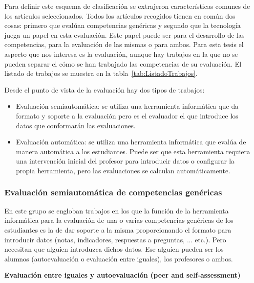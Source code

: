 
Para definir  este esquema de clasificación se extrajeron características comunes de los articulos seleccionados. Todos los artículos recogidos tienen en común dos cosas: primero que evalúan competencias genéricas y segundo que la tecnología juega un papel en esta evaluación. Este papel puede ser para el desarrollo de las competencias, para la evaluación de las mismas o para ambos. Para esta tesis el aspecto que nos interesa es la evaluación, aunque hay trabajos en la que no se pueden separar el cómo se han trabajado las competencias de su evaluación. El listado de trabajos se muestra en la tabla~\ref{tab:ListadoTrabajos}.

Desde el punto de vista de la evaluación hay dos tipos de trabajos:
\begin{itemize}
\item Evaluación semiautomática: se utiliza una herramienta informática que da formato y soporte a la evaluación pero es el evaluador el que introduce los datos que conformarán las evaluaciones. 
\item Evaluación automática:  se utiliza una herramienta informática que evalúa de manera automática a los estudiantes. Puede ser que esta herramienta requiera una intervención inicial del profesor para introducir datos o configurar la propia herramienta, pero las evaluaciones se calculan automáticamente.
\end{itemize}

\subsubsection{Evaluación semiautomática de competencias genéricas}

En este grupo se engloban trabajos en los que la función de la herramienta informática para la evaluación de una o varias competencias genéricas de los estudiantes es la de dar soporte a la misma proporcionando el formato para introducir datos (notas, indicadores, respuestas a preguntas, ... etc.). Pero necesitan que alguien introduzca dichos datos. Ese alguien pueden ser los alumnos (autoevaluación o evaluación entre iguales), los profesores o ambos.


\bigskip
\textbf{Evaluación entre iguales y autoevaluación (peer and self-assessment)}
\bigskip


